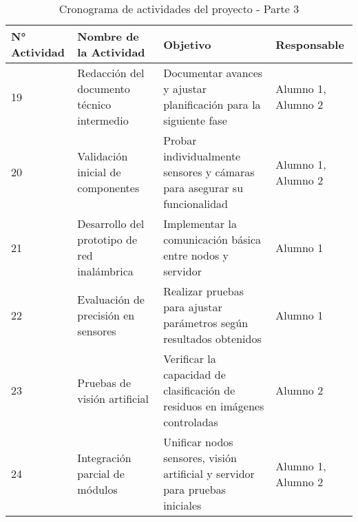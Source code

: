 \begin{table}[H]
    \centering
    \renewcommand{\arraystretch}{1.5}
    \begin{tabular}{ |p{1.5cm}|p{5cm}|p{5.5cm}|p{2.5cm}| }

        \hline
        \textbf{N° Actividad} & \textbf{Nombre de la Actividad} & \textbf{Objetivo} & \textbf{Responsable} \\
        \hline
        19 & Redacción del documento técnico intermedio & Documentar avances y ajustar planificación para la siguiente fase & Alumno 1, Alumno 2 \\\hline
        20 & Validación inicial de componentes & Probar individualmente sensores y cámaras para asegurar su funcionalidad & Alumno 1, Alumno 2 \\\hline
        21 & Desarrollo del prototipo de red inalámbrica & Implementar la comunicación básica entre nodos y servidor & Alumno 1 \\\hline
        22 & Evaluación de precisión en sensores & Realizar pruebas para ajustar parámetros según resultados obtenidos & Alumno 1 \\\hline
        23 & Pruebas de visión artificial & Verificar la capacidad de clasificación de residuos en imágenes controladas & Alumno 2 \\\hline
        24 & Integración parcial de módulos & Unificar nodos sensores, visión artificial y servidor para pruebas iniciales & Alumno 1, Alumno 2 \\\hline

    \end{tabular}
    \caption{Cronograma de actividades del proyecto - Parte 3}
    \label{tab:cronograma_proyecto_parte3}
\end{table}





